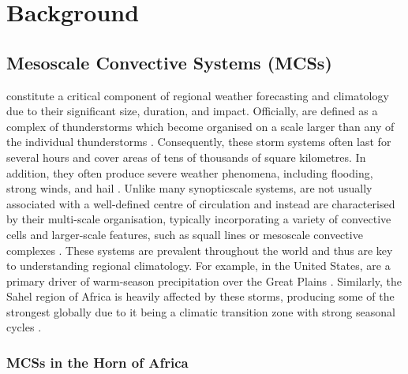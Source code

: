 \chapter{Background}
\label{ch:background}

\section{Mesoscale Convective Systems (MCSs)}

 constitute a critical component of regional weather forecasting and climatology due to their significant size, duration, and impact. Officially,  are defined as a complex of thunderstorms which become organised on a scale larger than any of the individual thunderstorms \citep{NOAANWS2025}. Consequently, these storm systems often last for several hours and cover areas of tens of thousands of square kilometres. In addition, they often produce severe weather phenomena, including flooding, strong winds, and hail \citep{Houze2014}. Unlike many \Gls{synopticscale} systems,  are not usually associated with a well-defined centre of circulation and instead are characterised by their multi-scale organisation, typically incorporating a variety of convective cells and larger-scale features, such as squall lines or mesoscale convective complexes \citep{AMS2024,NOAANWS2025}. These systems are prevalent throughout the world and thus are key to understanding regional climatology. For example, in the United States,  are a primary driver of warm-season precipitation over the Great Plains \citep{Haberlie2019}. Similarly, the Sahel region of Africa is heavily affected by these storms, producing some of the strongest  globally due to it being a climatic transition zone with strong seasonal cycles \citep{Zipser2006}.

\subsection{MCSs in the Horn of Africa}

